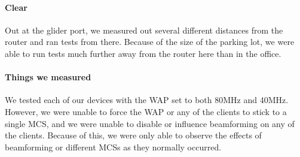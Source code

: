 \paragraph{Clear}
Out at the glider port, we measured out several different distances from the
router and ran tests from there. Because of the size of the parking lot, we were
able to run tests much further away from the router here than in the office.

\paragraph{  Things we measured }
We tested each of our devices with the WAP set to both 80MHz and 40MHz.
However, we were unable to force the WAP or any of the clients to stick to a
single MCS, and we were unable to disable or influence beamforming on any of the
clients. Because of this, we were only able to observe the effects of
beamforming or different MCSs as they normally occurred.




